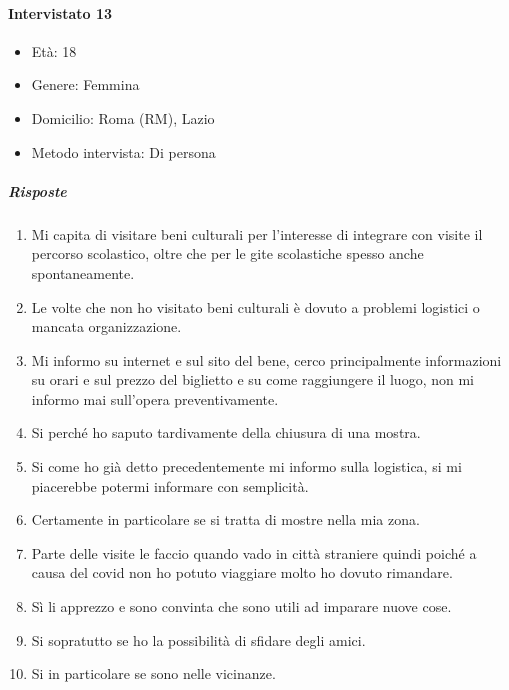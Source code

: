 \documentclass{article}
\begin{document}
\paragraph{Intervistato 13}
\begin{itemize}
\item Età: 18
\item Genere: Femmina
\item Domicilio: Roma (RM), Lazio
\item Metodo intervista: Di persona
\end{itemize}
\subparagraph{Risposte}
\begin{enumerate}
\item Mi capita di visitare beni culturali per l’interesse di integrare con visite il percorso scolastico, oltre che per le gite scolastiche spesso anche spontaneamente.
\item Le volte che non ho visitato beni culturali è dovuto a problemi logistici o mancata organizzazione.
\item Mi informo su internet e sul sito del bene, cerco principalmente informazioni su orari e sul prezzo del biglietto e su come raggiungere il luogo, non mi informo mai sull'opera preventivamente.
\item Si perché ho saputo tardivamente della chiusura di una mostra.
\item Si come ho già detto precedentemente mi informo sulla logistica, si mi piacerebbe potermi informare con semplicità.
\item Certamente in particolare se si tratta di mostre nella mia zona.
\item Parte delle visite le faccio quando vado in città straniere quindi poiché a causa del covid non ho potuto viaggiare molto ho dovuto rimandare.
\item Sì li apprezzo e sono convinta che sono utili ad imparare nuove cose.
\item Si sopratutto se ho la possibilità di sfidare degli amici.
\item Si in particolare se sono nelle vicinanze.
\end{enumerate}
\end{document}

